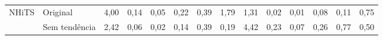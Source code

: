 \begin{tabular}{llcccccccccccc}
	\midrule
	\multirow{2}{*}{\ac{NHiTS}}
	                                    & Original                                        & 4,00                                                           & 0,14          & 0,05          & 0,22          & 0,39          & 1,79          & 1,31          & 0,02          & 0,01          & 0,08          & 0,11          & 0,75          \\
	                                    & Sem tendência                                   & 2,42                                                           & 0,06          & 0,02          & 0,14          & 0,39          & 0,19          & 4,42          & 0,23          & 0,07          & 0,26          & 0,77          & 0,50          \\
	\bottomrule
\end{tabular}